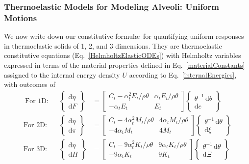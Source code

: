 \subsubsection{Thermoelastic Models for Modeling Alveoli: Uniform Motions}

We now write down our constitutive formul\ae\ for quantifying uniform responses in thermo\-elastic solids of 1, 2, and 3 dimensions.  They are thermo\-elastic constitutive equations (Eq.~\ref{HelmholtzElasticODEs}) with Helmholtz variables expressed in terms of the material properties defined in Eq.~\ref{materialConstants} assigned to the internal energy density $U$ according to Eq.~\ref{internalEnergies}, with outcomes of
\begin{subequations}
    \label{HelmholtzCEs}
    \begin{align}\
    \text{For 1D:} & &
    \left\{ \begin{matrix}
    \mathrm{d} \eta \\ \mathrm{d} F
    \end{matrix} \right\} & = \begin{bmatrix}
    C_t - \alpha^2_t E_t / \rho \theta & 
    \alpha_t E_t / \rho \theta \\
    -\alpha_t E_t & E_t
    \end{bmatrix} \left\{ \begin{matrix}
    \theta^{-1} \, \mathrm{d} \theta \\ \mathrm{d} e
    \end{matrix} \right\} \label{Helmholtz1D} \\
    \text{For 2D:} & &
    \left\{ \begin{matrix}
    \mathrm{d} \eta \\ \mathrm{d} \pi
    \end{matrix} \right\} & = \begin{bmatrix}
    C_t - 4 \alpha_t^2 M_t / \rho \theta & 
    4 \alpha_t M_t / \rho \theta \\
    -4 \alpha_t M_t & 4 M_t
    \end{bmatrix} \left\{ \begin{matrix}
    \theta^{-1} \, \mathrm{d} \theta \\ \mathrm{d} \xi
    \end{matrix} \right\} \label{Helmholtz2D} \\
    \text{For 3D:} & &
    \left\{ \begin{matrix}
    \mathrm{d} \eta \\ \mathrm{d} \Pi
    \end{matrix} \right\} & = \begin{bmatrix}
    C_t - 9 \alpha^2_t K_t / \rho \theta & 
    9 \alpha_t K_t / \rho \theta \\
    -9 \alpha_t K_t & 9 K_t
    \end{bmatrix} \left\{ \begin{matrix}
    \theta^{-1} \, \mathrm{d} \theta \\ \mathrm{d} \Xi
    \end{matrix} \right\} \label{Helmholtz3D}
    \end{align}
\end{subequations}
